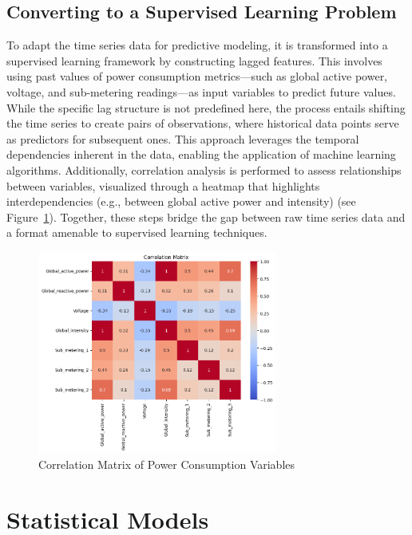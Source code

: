 	\subsection{Converting to a Supervised Learning Problem}
	To adapt the time series data for predictive modeling, it is transformed into a supervised learning framework by constructing lagged features. This involves using past values of power consumption metrics—such as global active power, voltage, and sub-metering readings—as input variables to predict future values. While the specific lag structure is not predefined here, the process entails shifting the time series to create pairs of observations, where historical data points serve as predictors for subsequent ones. This approach leverages the temporal dependencies inherent in the data, enabling the application of machine learning algorithms. Additionally, correlation analysis is performed to assess relationships between variables, visualized through a heatmap that highlights interdependencies (e.g., between global active power and intensity) (see Figure~\ref{fig:correlation_matrix}). Together, these steps bridge the gap between raw time series data and a format amenable to supervised learning techniques.
	
	\begin{figure}[htbp]
		\centering
		\includegraphics[width=0.7\textwidth]{./figures_aman/correlation_matrix.png}
		\caption{Correlation Matrix of Power Consumption Variables}
		\label{fig:correlation_matrix}
	\end{figure}
	
	\section{Statistical Models}
	
